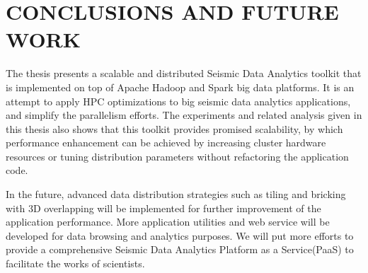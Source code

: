 %
%
%



\chapter{\uppercase{Conclusions and Future Work}}

The thesis presents a scalable and distributed Seismic Data Analytics toolkit that is implemented on top of Apache Hadoop and Spark big data platforms. It is an attempt to apply HPC optimizations to big seismic data analytics applications, and simplify the parallelism efforts. The experiments and related analysis given in this thesis also shows that this toolkit provides promised scalability, by which performance enhancement can be achieved by increasing cluster hardware resources or tuning distribution parameters without refactoring the application code.

In the future, advanced data distribution strategies such as tiling and bricking with 3D overlapping will be implemented for further improvement of the application performance. More application utilities and web service will be developed for data browsing and analytics purposes. We will put more efforts to provide a comprehensive Seismic Data Analytics Platform as a Service(PaaS) to facilitate the works of scientists. 




